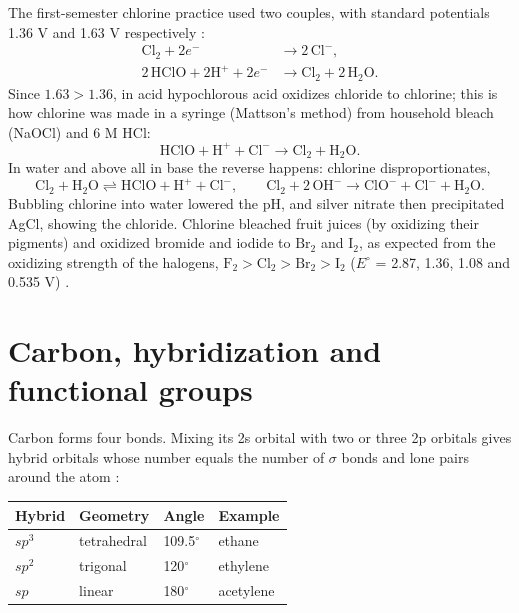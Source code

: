 The first-semester chlorine practice used two
couples, with standard potentials 1.36 V and
1.63 V respectively \cite[Appendix
M]{kotz2012chemistry}:
$$
\begin{aligned}
\mathrm{Cl_2} + 2e^- &\rightarrow
2\,\mathrm{Cl^-},\\
2\,\mathrm{HClO} + 2\mathrm{H^+} + 2e^-
&\rightarrow \mathrm{Cl_2} +
2\,\mathrm{H_2O}.
\end{aligned}
$$
Since $1.63 > 1.36$, in acid hypochlorous
acid oxidizes chloride to chlorine; this is
how chlorine was made in a syringe (Mattson's
method) from household bleach (NaOCl) and 6 M
HCl:
$$
\mathrm{HClO} + \mathrm{H^+} + \mathrm{Cl^-}
\rightarrow \mathrm{Cl_2} + \mathrm{H_2O}.
$$
In water and above all in base the reverse
happens: chlorine disproportionates,
$$
\mathrm{Cl_2} + \mathrm{H_2O}
\rightleftharpoons \mathrm{HClO} +
\mathrm{H^+} + \mathrm{Cl^-}, \qquad
\mathrm{Cl_2} + 2\,\mathrm{OH^-} \rightarrow
\mathrm{ClO^-} + \mathrm{Cl^-} +
\mathrm{H_2O}.
$$
Bubbling chlorine into water lowered the pH,
and silver nitrate then precipitated AgCl,
showing the chloride. Chlorine bleached fruit
juices (by oxidizing their pigments) and
oxidized bromide and iodide to
$\mathrm{Br_2}$ and $\mathrm{I_2}$, as
expected from the oxidizing strength of the
halogens, $\mathrm{F_2} > \mathrm{Cl_2} >
\mathrm{Br_2} > \mathrm{I_2}$ ($E^\circ$ =
2.87, 1.36, 1.08 and 0.535 V) \cite[Section
21.10]{kotz2012chemistry}.

\section{Carbon, hybridization and functional
groups}
\label{section-chem-carbon}

Carbon forms four bonds. Mixing its 2s
orbital with two or three 2p orbitals gives
hybrid orbitals whose number equals the
number of $\sigma$ bonds and lone pairs
around the atom \cite[Sections 2-4 and
2-6]{wade2013organic}:

\begin{center}
\begin{tabular}{llll}
Hybrid & Geometry & Angle & Example \\
\hline
$sp^3$ & tetrahedral & 109.5$^\circ$ & ethane
\\
$sp^2$ & trigonal & 120$^\circ$ & ethylene \\
$sp$ & linear & 180$^\circ$ & acetylene \\
\end{tabular}
\end{center}

